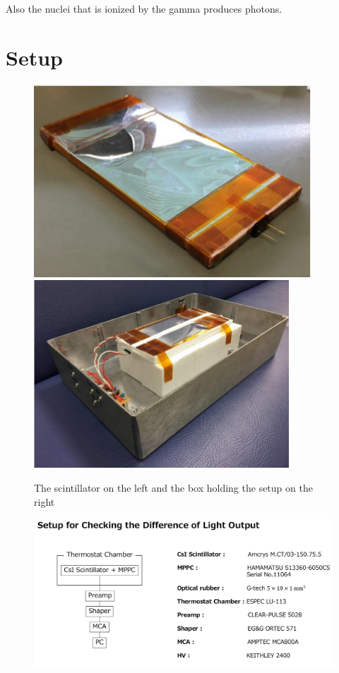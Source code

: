 \documentclass[12pt, a4paper,titlepage]{article}
\numberwithin{equation}{section}
\numberwithin{figure}{section}
\begin{document}
Also the nuclei that is ionized by the gamma produces photons.

\section{Setup}

\begin{figure}[htbp]
 \centering %
 \includegraphics[width=.4\textwidth,origin=c,angle=0]{images/1channelsetup.png}
 \qquad
 \includegraphics[width=.4\textwidth,origin=c,angle=0]{images/1channelsetupbox.png} 
 \caption{\label{fig:i} The scintillator on the left and the box holding the setup on the right}
 \end{figure}


\begin{figure}
\includegraphics[width=130.0mm]{images/1channelelectronics.png}
\end{figure}
\end{document}
